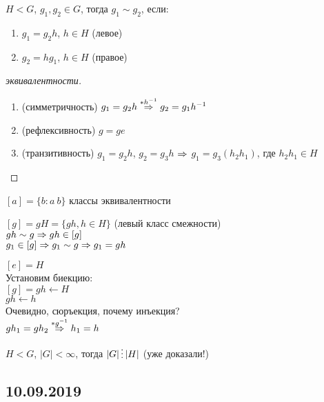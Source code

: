 \documentclass[12pt, fleqn]{article}
\begin{document}
\begin{definition}
    $H<G$, $g_1,g_2 \in G$, тогда $g_1 \sim g_2$, если:
    \begin{enumerate}                               
    	\item $g_1=g_2 h$, $h \in H$ (левое)
    	\item $g_2=h g_1$, $h \in H$ (правое)
	\end{enumerate} 
\end{definition}

\begin{proof}[эквивалентности]
    \begin{enumerate}                               
    	\item (симметричность) $g_1=g_2 h \overset{*h^{-1}}{\Rightarrow} g_2 = g_1 h^{-1}$
    	\item (рефлексивность) $g=g e$
    	\item (транзитивность) $g_1=g_2 h$, $g_2 = g_3 h$ $\Rightarrow$ $g_1=g_3(h_2 h_1)$, где $h_2 h_1 \in H$
	\end{enumerate} 
\end{proof}

\begin{definition}
    $[a] = \{b:a ~ b\}$ классы эквивалентности
\end{definition}

\begin{definition}
    $[g] = g H = \{g h, h \in H \}$ (левый класс смежности) 
    \\
    $g h \sim g \Rightarrow g h \in [g]$
    \\
    $g_1 \in [g] \Rightarrow g_1 \sim g \Rightarrow g_1 = g h$
\end{definition}

\begin{utv}
    $[e]=H$
    \\
    Установим биекцию: 
    \\
    $[g]=g h \leftarrow H$
    \\
    $g h \leftarrow h$
    \\
    Очевидно, сюръекция, почему инъекция? 
    \\
    $g h_1 = g h_2 \overset{*g^{-1}}{\Rightarrow} h_1 = h$
\end{utv}

\begin{theorem}[Лагранжа]
$H < G$, $|G| < \infty$, тогда $|G| \devides |H|$ (уже доказали!)
\end{theorem}
\subsection{10.09.2019}
\end{document}
